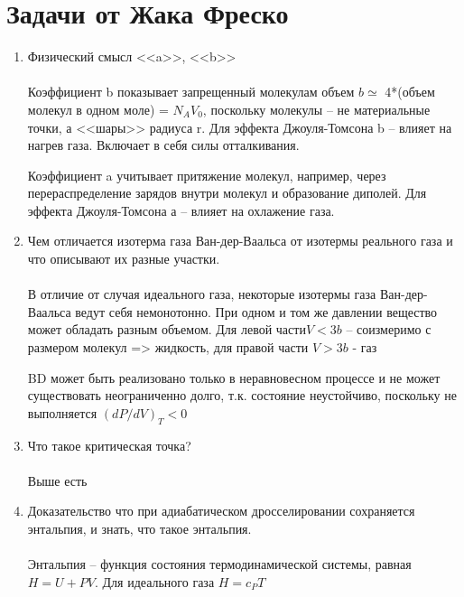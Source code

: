 \documentclass[a4paper,12pt]{article} %
\begin{document}
\section{Задачи от Жака Фреско}
\begin{enumerate}

\item  Физический смысл <<a>>, <<b>> \\ \\
Коэффициент b показывает запрещенный молекулам объем $b \simeq$ 4*(объем молекул в одном моле) = $N_AV_0$, поскольку молекулы -- не материальные точки, а <<шары>> радиуса r. Для эффекта Джоуля-Томсона b -- влияет на нагрев газа. Включает в себя силы отталкивания.

Коэффициент a учитывает притяжение молекул, например, через перераспределение зарядов внутри молекул и образование диполей. Для эффекта Джоуля-Томсона а -- влияет на охлажение газа. 
\item Чем отличается изотерма газа Ван-дер-Ваальса от изотермы реального газа и что описывают их разные участки.\\ \\
В отличие от случая идеального газа, некоторые изотермы газа Ван-дер-Ваальса ведут себя немонотонно. При одном и том же давлении вещество может обладать разным объемом. Для левой части$V < 3b$ -- соизмеримо с размером молекул => жидкость, для правой части $V > 3b$ - газ 

BD может быть реализовано только в неравновесном процессе и не может существовать неограниченно долго, т.к. состояние неустойчиво, поскольку не выполняется $(dP/dV)_T < 0$
\begin{figure}[h]
\end{figure}
\item Что такое критическая точка?\\ \\ 
Выше есть
\item Доказательство что при адиабатическом дросселировании сохраняется энтальпия, и знать, что такое энтальпия.\\ \\
Энтальпия -- функция состояния термодинамической системы, равная $H = U + PV$. Для идеального газа $H = c_PT$


\end{enumerate}
\end{document}
